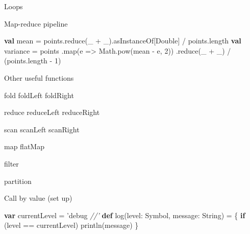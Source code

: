 \documentclass[ignorenonframetext,]{beamer}
\newenvironment{Shaded}{\begin{snugshade}}{\end{snugshade}}
\newcommand{\KeywordTok}[1]{\textcolor[rgb]{0.13,0.29,0.53}{\textbf{#1}}}
\newcommand{\DecValTok}[1]{\textcolor[rgb]{0.00,0.00,0.81}{#1}}
\newcommand{\CommentTok}[1]{\textcolor[rgb]{0.56,0.35,0.01}{\textit{#1}}}
\newcommand{\FunctionTok}[1]{\textcolor[rgb]{0.00,0.00,0.00}{#1}}
\newcommand{\NormalTok}[1]{#1}
\begin{document}
\begin{frame}[fragile]{Loops}
\begin{block}{Map-reduce pipeline}
\begin{Shaded}
\begin{Highlighting}[]
\KeywordTok{val}\NormalTok{ mean = points.}\FunctionTok{reduce}\NormalTok{(_ + _).}\FunctionTok{asInstanceOf}\NormalTok{[Double] / points.}\FunctionTok{length}
\KeywordTok{val}\NormalTok{ variance = points}
\NormalTok{      .}\FunctionTok{map}\NormalTok{(e => Math.}\FunctionTok{pow}\NormalTok{(mean - e, }\DecValTok{2}\NormalTok{))}
\NormalTok{      .}\FunctionTok{reduce}\NormalTok{(_ + _) / (points.}\FunctionTok{length}\NormalTok{ - }\DecValTok{1}\NormalTok{)}
\end{Highlighting}
\end{Shaded}

\end{block}

\begin{block}{Other useful functions}

\begin{Shaded}
\begin{Highlighting}[]
\NormalTok{fold}
\NormalTok{foldLeft}
\NormalTok{foldRight}

\NormalTok{reduce}
\NormalTok{reduceLeft}
\NormalTok{reduceRight}

\NormalTok{scan}
\NormalTok{scanLeft}
\NormalTok{scanRight}
\end{Highlighting}
\end{Shaded}

\begin{Shaded}
\begin{Highlighting}[]
\NormalTok{map}
\NormalTok{flatMap}

\NormalTok{filter}

\NormalTok{partition}
\end{Highlighting}
\end{Shaded}

\end{block}

\begin{block}{Call by value (set up)}

\begin{Shaded}
\begin{Highlighting}[]
\KeywordTok{var}\NormalTok{ currentLevel = 'debug                                                         }\CommentTok{//'}
\KeywordTok{def} \FunctionTok{log}\NormalTok{(level: Symbol, message: String) = \{}
  \KeywordTok{if}\NormalTok{ (level == currentLevel)}
    \FunctionTok{println}\NormalTok{(message)}
\NormalTok{\}}


\end{Highlighting}
\end{Shaded}
\end{block}
\end{frame}
\end{document}
